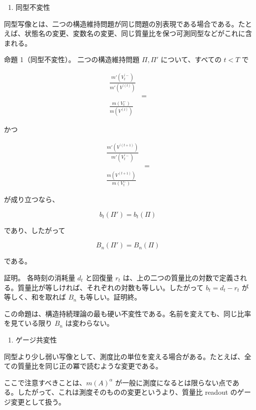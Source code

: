 \documentclass[12pt,a4paper]{article}
\begin{document}
\begin{enumerate}
\def\labelenumi{\arabic{enumi}.}
\setcounter{enumi}{2}
\tightlist
\item
  同型不変性
\end{enumerate}

同型写像とは、二つの構造維持問題が同じ問題の別表現である場合である。たとえば、状態名の変更、変数名の変更、同じ質量比を保つ可測同型などがこれに含まれる。

命題 1（同型不変性）。 二つの構造維持問題 \(\Pi,\Pi'\) について、すべての \(t<T\) で

\[
\begin{aligned}
\frac{m'(V_{t}^{\prime -})}{m'(V^{\prime(t)})} \\
&= \\
\frac{m(V_{t}^-)}{m(V^{(t)})}
\end{aligned}
\]

かつ

\[
\begin{aligned}
\frac{m'(V^{\prime(t+1)})}{m'(V_{t}^{\prime -})} \\
&= \\
\frac{m(V^{(t+1)})}{m(V_{t}^-)}
\end{aligned}
\]

が成り立つなら、

\[
b_{t}(\Pi')=b_{t}(\Pi)
\]

であり、したがって

\[
B_{n}(\Pi')=B_{n}(\Pi)
\]

である。

証明。 各時刻の消耗量 \(d_{t}\) と回復量 \(r_{t}\) は、上の二つの質量比の対数で定義される。質量比が等しければ、それぞれの対数も等しい。したがって \(b_{t}=d_{t}-r_{t}\) が等しく、和を取れば \(B_{n}\) も等しい。証明終。

この命題は、構造持続理論の最も硬い不変性である。名前を変えても、同じ比率を見ている限り \(B_{n}\) は変わらない。

\begin{enumerate}
\def\labelenumi{\arabic{enumi}.}
\setcounter{enumi}{3}
\tightlist
\item
  ゲージ共変性
\end{enumerate}

同型より少し弱い写像として、測度比の単位を変える場合がある。たとえば、全ての質量比を同じ正の冪で読むような変更である。

ここで注意すべきことは、\(m(A)^\alpha\) が一般に測度になるとは限らない点である。したがって、これは測度そのものの変更というより、質量比 readout のゲージ変更として扱う。
\end{document}
